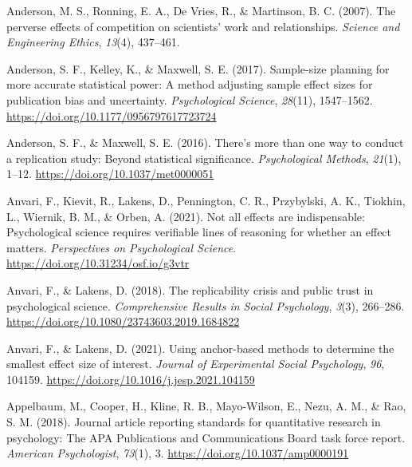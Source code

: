 \documentclass[
  letterpaper,
  DIV=11,
  numbers=noendperiod]{scrreprt}
\newlength{\cslhangindent}
\newlength{\cslentryspacingunit} %
\newenvironment{CSLReferences}[2] %
 {%
  \setlength{\parindent}{0pt}
  \ifodd #1
  \let\oldpar\par
  \def\par{\hangindent=\cslhangindent\oldpar}
  \fi
  \setlength{\parskip}{#2\cslentryspacingunit}
 }%
 {}
\begin{document}
\begin{CSLReferences}{1}{0}
\leavevmode{}%
Anderson, M. S., Ronning, E. A., De Vries, R., \& Martinson, B. C.
(2007). The perverse effects of competition on scientists' work and
relationships. \emph{Science and Engineering Ethics}, \emph{13}(4),
437--461.

\leavevmode{}%
Anderson, S. F., Kelley, K., \& Maxwell, S. E. (2017). Sample-size
planning for more accurate statistical power: {A} method adjusting
sample effect sizes for publication bias and uncertainty.
\emph{Psychological Science}, \emph{28}(11), 1547--1562.
\url{https://doi.org/10.1177/0956797617723724}

\leavevmode{}%
Anderson, S. F., \& Maxwell, S. E. (2016). There's more than one way to
conduct a replication study: {Beyond} statistical significance.
\emph{Psychological Methods}, \emph{21}(1), 1--12.
\url{https://doi.org/10.1037/met0000051}

\leavevmode{}%
Anvari, F., Kievit, R., Lakens, D., Pennington, C. R., Przybylski, A.
K., Tiokhin, L., Wiernik, B. M., \& Orben, A. (2021). Not all effects
are indispensable: {Psychological} science requires verifiable lines of
reasoning for whether an effect matters. \emph{Perspectives on
Psychological Science}. \url{https://doi.org/10.31234/osf.io/g3vtr}

\leavevmode{}%
Anvari, F., \& Lakens, D. (2018). The replicability crisis and public
trust in psychological science. \emph{Comprehensive Results in Social
Psychology}, \emph{3}(3), 266--286.
\url{https://doi.org/10.1080/23743603.2019.1684822}

\leavevmode{}%
Anvari, F., \& Lakens, D. (2021). Using anchor-based methods to
determine the smallest effect size of interest. \emph{Journal of
Experimental Social Psychology}, \emph{96}, 104159.
\url{https://doi.org/10.1016/j.jesp.2021.104159}

\leavevmode{}%
Appelbaum, M., Cooper, H., Kline, R. B., Mayo-Wilson, E., Nezu, A. M.,
\& Rao, S. M. (2018). Journal article reporting standards for
quantitative research in psychology: {The APA Publications} and
{Communications Board} task force report. \emph{American Psychologist},
\emph{73}(1), 3. \url{https://doi.org/10.1037/amp0000191}


\end{CSLReferences}
\end{document}

